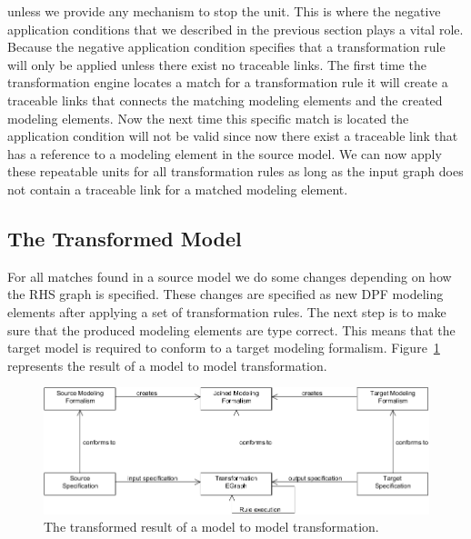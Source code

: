 unless we provide any mechanism to stop the unit. This is where the negative
application conditions that we described in the previous section plays a vital
role. Because the negative application condition specifies that a
transformation rule will only be applied unless there exist no traceable links.
The first time the transformation engine locates a match for a transformation
rule it will create a traceable links that connects the matching modeling
elements and the created modeling elements. Now the next time this specific
match is located the application condition will not be valid since now there
exist a traceable link that has a reference to a modeling element in the source
model. We can now apply these repeatable units for all transformation rules as
long as the input graph does not contain a traceable link for a matched
modeling element.

\subsection{The Transformed Model}

For all matches found in a source model we do some changes depending on how the
RHS graph is specified. These changes are specified as new DPF modeling elements
after applying a set of transformation rules. The next step is to make sure that
the produced modeling elements are type correct. This means that the target
model is required to conform to a target modeling formalism.
Figure~\ref{fig:transformed_model} represents the result of a model to model
transformation.

\begin{figure}[H] 
	\centering
	\includegraphics[scale=0.7]{./Figures/Transformed_model.png}
	\caption[The transformed specification]
	{The transformed result of a model to model transformation.}
	\label{fig:transformed_model}
\end{figure}

